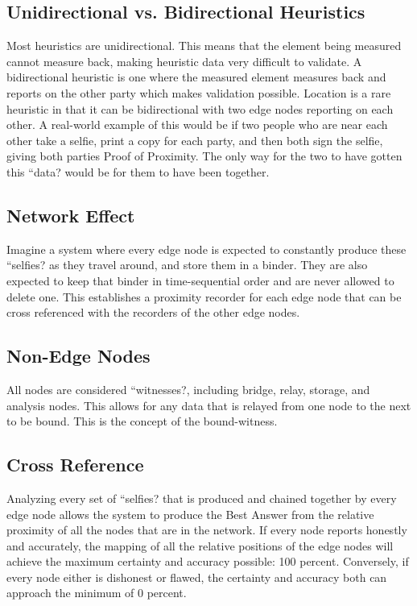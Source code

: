 \documentclass{article}
\begin{document}
\subsection {Unidirectional vs. Bidirectional Heuristics}
Most \glspl{heuristic} are unidirectional. This means that the element being measured cannot measure back, making heuristic data very difficult to validate. A bidirectional heuristic is one where the measured element measures back and reports on the other party which makes validation possible. Location is a rare heuristic in that it can be bidirectional with two edge nodes reporting on each other. A real-world example of this would be if two people who are near each other take a selfie, print a copy for each party, and then both sign the selfie, giving both parties Proof of Proximity. The only way for the two to have gotten this ``data? would be for them to have been together.

\subsection {Network Effect}
Imagine a system where every edge node is expected to constantly produce these ``selfies? as they travel around, and store them in a binder. They are also expected to keep that binder in time-sequential order and are never allowed to delete one. This establishes a proximity recorder for each edge node that can be cross referenced with the recorders of the other edge nodes.

\subsection {Non-Edge Nodes}
All nodes are considered ``witnesses?, including bridge, relay, storage, and analysis nodes. This allows for any data that is relayed from one node to the next to be bound. This is the concept of the \Gls{bound-witness}.

\subsection {Cross Reference}
Analyzing every set of ``selfies? that is produced and chained together by every edge node allows the system to produce the Best Answer from the relative proximity of all the nodes that are in the network. If every node reports honestly and accurately, the mapping of all the relative positions of the edge nodes will achieve the maximum \gls{certainty} and \gls{accuracy} possible: 100 percent. Conversely, if every node either is dishonest or flawed, the certainty and accuracy both can approach the minimum of 0 percent.
\end{document}

